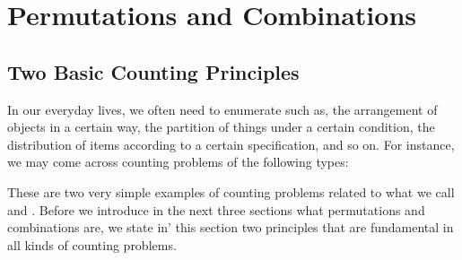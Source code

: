 \documentclass[a4paper,11pt]{book}
\begin{document}
\chapter{Permutations and Combinations}

\section{Two Basic Counting Principles }
In our everyday lives, we often need to enumerate  such as, the 
arrangement of objects in a certain way, the partition of things under a 
certain condition, the distribution of items according to a certain specification, and so on. For instance, we may come across counting problems of 
the following types: 



These are two very simple examples of counting problems related to 
what we call  and . Before we introduce in 
the next three sections what permutations and combinations are, we state 
in' this section two principles that are fundamental in all kinds of counting 
problems. \\
\end{document}
